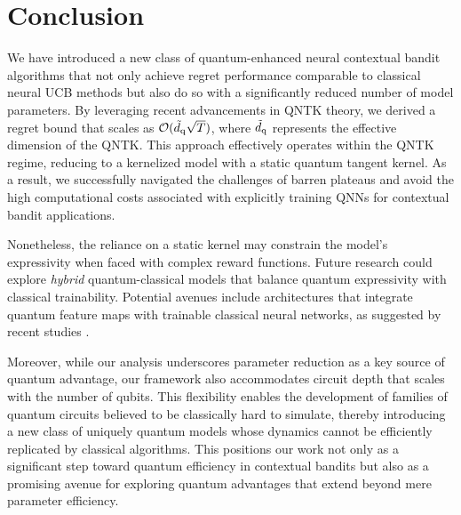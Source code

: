 \documentclass[pdflatex,sn-mathphys-num]{sn-jnl}%
\theoremstyle{thmstyleone}%
\theoremstyle{thmstyletwo}%
\theoremstyle{thmstylethree}%
\begin{document}
\section{Conclusion}\label{sec13}
We have introduced a new class of quantum-enhanced neural contextual bandit algorithms that not only achieve regret performance comparable to classical neural UCB methods but also do so with a significantly reduced number of model parameters. By leveraging recent advancements in QNTK theory, we derived a regret bound that scales as $\mathcal{O}(\tilde{d}_{\rm q}\sqrt{T})$, where $\tilde{d}_{\rm q}$ represents the effective dimension of the QNTK. This approach effectively operates within the QNTK regime, reducing to a kernelized model with a static quantum tangent kernel. As a result, we successfully navigated the challenges of barren plateaus and avoid the high computational costs associated with explicitly training QNNs  for contextual bandit applications.

Nonetheless, the reliance on a static kernel may constrain the model's expressivity when faced with complex reward functions. Future research could explore {\em   hybrid} quantum-classical models that balance quantum expressivity with classical trainability. Potential avenues include architectures that integrate quantum feature maps with trainable classical neural networks, as suggested by recent studies \cite{nakaji2023quantum}. 

Moreover, while our analysis underscores parameter reduction as a key source of quantum advantage, our framework also accommodates circuit depth that scales with the number of qubits. This flexibility enables the development of families of quantum circuits believed to be classically hard to simulate, thereby introducing a new class of uniquely quantum models whose dynamics cannot be efficiently replicated by classical algorithms. This positions our work not only as a significant step toward quantum efficiency in contextual bandits but also as a promising avenue for exploring quantum advantages that extend beyond mere parameter efficiency.
\end{document}
